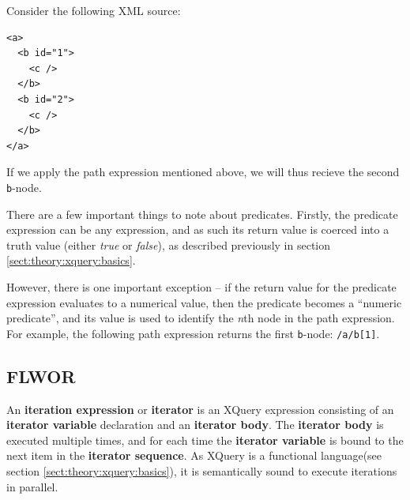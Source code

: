 Consider the following XML source:
\begin{Verbatim}
<a>
  <b id="1">
    <c />
  </b>
  <b id="2">
    <c />
  </b>
</a>
\end{Verbatim}
If we apply the path expression mentioned above, we will thus recieve the second
\verb!b!-node.

There are a few important things to note about predicates. Firstly, the
predicate expression can be any expression, and as such its return value is
coerced into a truth value (either \textit{true} or \textit{false}), as
described previously in section \ref{sect:theory:xquery:basics}.

However, there is one important exception -- if the return value for the
predicate expression evaluates to a numerical value, then the predicate
becomes a ``numeric predicate'', and its value is used to identify the
\textit{n}th node in the path expression. For example, the following path
expression returns the first \verb!b!-node: \verb!/a/b[1]!.

\subsection{FLWOR}
\label{sect:theory:xquery:Flwor}

\begin{myDefinition}
\label{definition:iteration_expression}
An \textbf{iteration expression} or \textbf{iterator} is an XQuery expression consisting of an \textbf{iterator
variable} declaration and an \textbf{iterator body}. The \textbf{iterator body} is executed multiple times, and
for each time the \textbf{iterator variable} is bound to the next item in the \textbf{iterator sequence}. As
XQuery is a functional language(see section \ref{sect:theory:xquery:basics}), it is semantically sound to execute
iterations in parallel.
\end{myDefinition}

